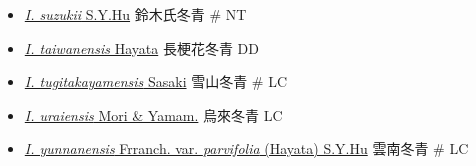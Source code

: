 \begin{itemize}
\begin{itemize}
        \item[] \href{http://www.theplantlist.org/tpl1.1/search?q=Ilex+suzukii}{\textit{I. suzukii} S.Y.Hu}   鈴木氏冬青  \# NT
        \item[] \href{http://www.theplantlist.org/tpl1.1/search?q=Ilex+taiwanensis}{\textit{I. taiwanensis} Hayata}   長梗花冬青   DD
        \item[] \href{http://www.theplantlist.org/tpl1.1/search?q=Ilex+tugitakayamensis}{\textit{I. tugitakayamensis} Sasaki}   雪山冬青  \# LC
        \item[] \href{http://www.theplantlist.org/tpl1.1/search?q=Ilex+uraiensis}{\textit{I. uraiensis} Mori \& Yamam.}   烏來冬青   LC
        \item[] \href{http://www.theplantlist.org/tpl1.1/search?q=Ilex+yunnanensis+var.+parvifolia}{\textit{I. yunnanensis} Frranch. var. \textit{parvifolia} (Hayata) S.Y.Hu}   雲南冬青  \# LC
  \end{itemize}
  \end{itemize}

